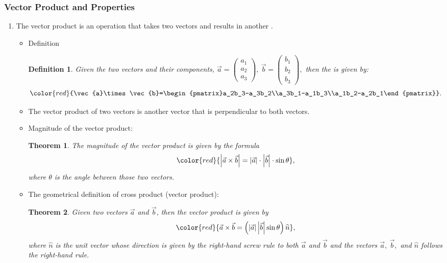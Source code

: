 \documentclass[12pt, a4paper]{article}
\newtheorem{theorem}{Theorem}[subsection]
\newtheorem{definition}{Definition}[subsection]
\begin{document}
\subsubsection{Vector Product and Properties}
\begin{enumerate}
  \item The vector product is an operation that takes two vectors and results in another {\color{red}{vector}}. 
  \begin{itemize}
    \item Definition
    \begin{definition}
    Given the two vectors and their components, $\vec{a}=\begin{pmatrix}a_1\\a_2\\a_3\end{pmatrix},\ \vec{b}=\begin{pmatrix}b_1\\b_2\\b_3\end{pmatrix},$ then the \textbf{\color{red}{vector product}} is given by: 
    $${\color{red}{\vec{a}\times\vec{b}=\begin{pmatrix}a_2b_3-a_3b_2\\a_3b_1-a_1b_3\\a_1b_2-a_2b_1\end{pmatrix}}}.$$
    \end{definition}
    \item The vector product of two vectors is another vector that is perpendicular to both vectors. 
    \item Magnitude of the vector product: 
    \begin{theorem}
      The magnitude of the vector product is given by the formula $${\color{red}{\left|\vec{a}\times\vec{b}\right|=\left|\vec{a}\right|\cdot\left|\vec{b}\right|\cdot\sin\theta}},$$
      where $\theta$ is the angle between those two vectors. 
      {}
    \end{theorem} 
    \item The geometrical definition of cross product (vector product): 
    \begin{theorem}
      Given two vectors $\vec{a}$ and $\vec{b}$, then the vector product is given by $${\color{red}{\vec{a}\times\vec{b}=\left(\left|\vec{a}\right|\left|\vec{b}\right|\sin\theta\right)\widehat{n}}},$$
      where $\widehat{n}$ is the unit vector whose direction is given by the right-hand screw rule to both $\vec{a}$ and $\vec{b}$ and the vectors $\vec{a},\ \vec{b},$ and $\widehat{n}$ follows the right-hand rule. 

\end{theorem}
\end{itemize}
\end{enumerate}
\end{document}
